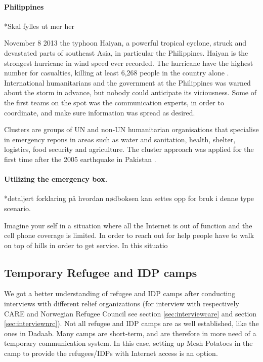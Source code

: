 \paragraph{Philippines}

*Skal fylles ut mer her

November 8 2013 the typhoon Haiyan, a powerful tropical cyclone, struck and devastated parts of southeast Asia, in particular the Philippines. Haiyan is the strongest hurricane in wind speed ever recorded. The hurricane have the highest number for casualties, killing at least 6,268 people in the country alone \cite{wikiHaiyan}. International humanitarians and the government at the Philippines was warned about the storm in advance, but nobody could anticipate its viciousness. Some of the first teams on the spot was the communication experts, in order to coordinate, and make sure information was spread as desired.    \cite{disasterResponse} 

Clusters are groups of UN and non-UN humanitarian organisations that specialise in emergency repons in areas such as water and sanitation, health, shelter, logistics, food security and agriculture. The cluster approach was applied for the first time after the 2005 earthquake in Pakistan \cite{disasterResponse}.


\paragraph{Utilizing the emergency box.}
*detaljert forklaring på hvordan nødboksen kan settes opp for bruk i denne type scenario. 

Imagine your self in a situation where all the Internet is out of function and the cell phone coverage is limited. In order to reach out for help people have to walk on top of hills in order to get service. 
In this situatio


\subsection{Temporary Refugee and IDP camps}
We got a better understanding of refugee and IDP camps after conducting interviews with different relief organizations (for interview with respectively CARE and Norwegian Refugee Council see section \ref{sec:interviewcare} and section \ref{sec:interviewnrc}). 
Not all refugee and IDP camps are as well established, like the ones in Dadaab. Many camps are short-term, and are therefore in more need of a temporary communication system. In this case, setting up Mesh Potatoes in the camp to provide the refugees/IDPs with Internet access is an option. 

